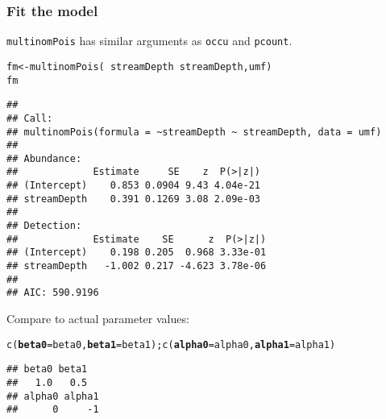 \documentclass[color=usenames,dvipsnames]{beamer}\usepackage[]{graphicx}\usepackage[]{color}
\makeatletter
\newcommand{\hlopt}[1]{\textcolor[rgb]{0,0,0}{#1}}%
\newcommand{\hlstd}[1]{\textcolor[rgb]{0,0,0}{#1}}%
\newcommand{\hlkwb}[1]{\textcolor[rgb]{0,0.341,0.682}{#1}}%
\newcommand{\hlkwc}[1]{\textcolor[rgb]{0,0,0}{\textbf{#1}}}%
\newcommand{\hlkwd}[1]{\textcolor[rgb]{0.004,0.004,0.506}{#1}}%
\newenvironment{kframe}{%
 \def\at@end@of@kframe{}%
 \ifinner\ifhmode%
  \def\at@end@of@kframe{\end{minipage}}%
  \begin{minipage}{\columnwidth}%
 \fi\fi%
 \def\FrameCommand##1{\hskip\@totalleftmargin \hskip-\fboxsep
 \colorbox{shadecolor}{##1}\hskip-\fboxsep
     \hskip-\linewidth \hskip-\@totalleftmargin \hskip\columnwidth}%
 \MakeFramed {\advance\hsize-\width
   \@totalleftmargin\z@ \linewidth\hsize
   \@setminipage}}%
 {\par\unskip\endMakeFramed%
 \at@end@of@kframe}
\newenvironment{knitrout}{}{} %
\newcommand{\inr}[1]{\colorbox{inlinecolor}{\texttt{#1}}}
\makeatother
\begin{document}



\begin{frame}[fragile]
  \frametitle{Fit the model}
  \footnotesize
  \inr{multinomPois} has similar arguments as \inr{occu} and
  \inr{pcount}. 
\begin{knitrout}\tiny
{}\color{fgcolor}\begin{kframe}
\begin{alltt}
\hlstd{fm} \hlkwb{<-} \hlkwd{multinomPois}\hlstd{(}\hlopt{~}\hlstd{streamDepth} \hlopt{~}\hlstd{streamDepth, umf)}
\hlstd{fm}
\end{alltt}
\begin{verbatim}
## 
## Call:
## multinomPois(formula = ~streamDepth ~ streamDepth, data = umf)
## 
## Abundance:
##             Estimate     SE    z  P(>|z|)
## (Intercept)    0.853 0.0904 9.43 4.04e-21
## streamDepth    0.391 0.1269 3.08 2.09e-03
## 
## Detection:
##             Estimate    SE      z  P(>|z|)
## (Intercept)    0.198 0.205  0.968 3.33e-01
## streamDepth   -1.002 0.217 -4.623 3.78e-06
## 
## AIC: 590.9196
\end{verbatim}
\end{kframe}
\end{knitrout}
\pause
\vfill
Compare to actual parameter values:
\vspace{-6pt}
\begin{knitrout}\tiny
{}\color{fgcolor}\begin{kframe}
\begin{alltt}
\hlkwd{c}\hlstd{(}\hlkwc{beta0}\hlstd{=beta0,} \hlkwc{beta1}\hlstd{=beta1);} \hlkwd{c}\hlstd{(}\hlkwc{alpha0}\hlstd{=alpha0,} \hlkwc{alpha1}\hlstd{=alpha1)}
\end{alltt}
\begin{verbatim}
## beta0 beta1 
##   1.0   0.5
## alpha0 alpha1 
##      0     -1
\end{verbatim}
\end{kframe}
\end{knitrout}
\end{frame}
\end{document}
